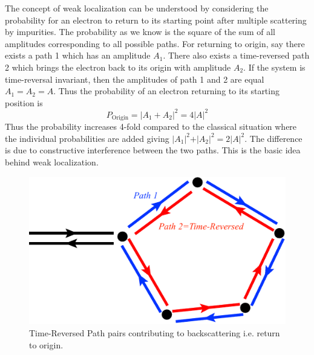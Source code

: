 \documentclass[aps,prb,onecolumn,notitlepage,showpacs,floatfix,superscriptaddress]{revtex4-1}
\begin{document}
The concept of weak localization can be understood by considering the probability for an electron to return to its starting point after multiple scattering by impurities. The probability as we know is the square of the sum of all amplitudes corresponding to all possible paths. For returning to origin, say there exists a path 1 which has an amplitude $A_1$. There also exists a time-reversed path 2 which brings the electron back to its origin with amplitude $A_2$. If the system is time-reversal invariant, then the amplitudes of path 1 and 2 are equal $A_1=A_2=A$. Thus the probability of an electron returning to its starting position is
\begin{equation}
P_\mathrm{Origin} = \vert A_1 +A_2 \vert^2 = 4 \vert A \vert^2
\end{equation} 
Thus the probability increases 4-fold compared to the classical situation where the individual probabilities are added giving $\vert A_1 \vert^2+\vert A_2 \vert^2=2\vert A \vert^2$. The difference is due to constructive interference between the two paths. This is the basic idea behind weak localization.
\begin{figure}[hbtp]
\centering
\includegraphics[scale=0.2]{TR_Paths.png}
\caption{Time-Reversed Path pairs contributing to backscattering i.e. return to origin.}
\end{figure}
\end{document}
